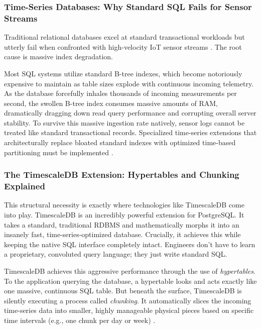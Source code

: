 \subsubsection{Time-Series Databases: Why Standard SQL Fails for Sensor Streams}

Traditional relational databases excel at standard transactional workloads but utterly fail when confronted with high-velocity IoT sensor streams \cite{tigerdata_tsdb_vs_rdbms}. The root cause is massive index degradation. 

Most SQL systems utilize standard B-tree indexes, which become notoriously expensive to maintain as table sizes explode with continuous incoming telemetry. As the database forcefully inhales thousands of incoming measurements per second, the swollen B-tree index consumes massive amounts of RAM, dramatically dragging down read query performance and corrupting overall server stability. To survive this massive ingestion rate natively, sensor logs cannot be treated like standard transactional records. Specialized time-series extensions that architecturally replace bloated standard indexes with optimized time-based partitioning must be implemented \cite{milvus_rdbms_limitations}.

\subsubsection{The TimescaleDB Extension: Hypertables and Chunking Explained}
This structural necessity is exactly where technologies like TimescaleDB come into play. TimescaleDB is an incredibly powerful extension for PostgreSQL. It takes a standard, traditional RDBMS and mathematically morphs it into an insanely fast, time-series-optimized database. Crucially, it achieves this while keeping the native SQL interface completely intact. Engineers don't have to learn a proprietary, convoluted query language; they just write standard SQL. 

TimescaleDB achieves this aggressive performance through the use of \textit{hypertables}. To the application querying the database, a hypertable looks and acts exactly like one massive, continuous SQL table. But beneath the surface, TimescaleDB is silently executing a process called \textit{chunking}. It automatically slices the incoming time-series data into smaller, highly manageable physical pieces based on specific time intervals (e.g., one chunk per day or week) \cite{tigerdata_tsdb_compared, tigerdata_best_practices_hypertables, tigerdata_timescale_alternatives, tigerdata_caggs_retention}.

